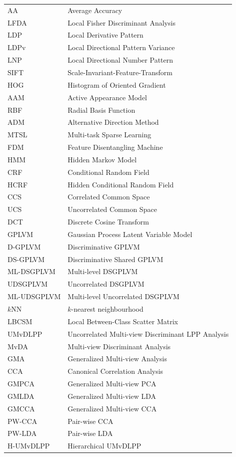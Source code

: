 \begin{longtable}{ll}
AA              & Average Accuracy \\
LFDA            & Local Fisher Discriminant Analysis \\
LDP             & Local Derivative Pattern \\
LDPv            & Local Directional Pattern Variance \\
LNP             & Local Directional Number Pattern \\
SIFT            & Scale-Invariant-Feature-Transform \\
HOG             & Histogram of Oriented Gradient \\
AAM             & Active Appearance Model  \\
RBF             & Radial Basis Function \\
ADM             & Alternative Direction Method \\
MTSL            & Multi-task Sparse Learning \\
FDM             & Feature Disentangling Machine \\
HMM             & Hidden Markov Model \\
CRF             & Conditional Random Field \\
HCRF            & Hidden Conditional Random Field \\
CCS             & Correlated Common Space \\
UCS             & Uncorrelated Common Space \\
DCT             & Discrete Cosine Transform  \\
GPLVM           & Gaussian Process Latent Variable Model \\
D-GPLVM         & Discriminative GPLVM \\
DS-GPLVM        & Discriminative Shared GPLVM \\
ML-DSGPLVM      & Multi-level DSGPLVM \\
UDSGPLVM        & Uncorrelated DSGPLVM \\
ML-UDSGPLVM     & Multi-level Uncorrelated DSGPLVM \\
$k$NN           & $k$-nearest neighbourhood \\
LBCSM           & Local Between-Class Scatter Matrix \\
UMvDLPP         & Uncorrelated Multi-view Discriminant LPP Analysis \\
MvDA            & Multi-view Discriminant Analysis \\
GMA             & Generalized Multi-view Analysis \\
CCA             & Canonical Correlation Analysis \\
GMPCA           & Generalized Multi-view PCA \\
GMLDA           & Generalized Multi-view LDA \\
GMCCA           & Generalized Multi-view CCA \\
PW-CCA          & Pair-wise CCA \\
PW-LDA          & Pair-wise LDA \\
H-UMvDLPP       & Hierarchical UMvDLPP





\end{longtable}

